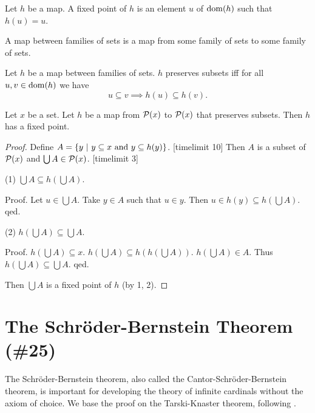 \documentclass{article}
\newcommand{\pow}{{\cal P}}
\begin{document}
 \begin{forthel}
    \begin{definition}
      Let $h$ be a map.
      A fixed point of $h$ is an element $u$ of $\operatorname{dom}(h)$ such that $h(u) = u$.
    \end{definition}

    \begin{definition}
      A map between families of sets is a map from some family of
sets to some
      family of sets.
    \end{definition}

    \begin{definition*}
Let $h$ be a map between families of sets.
      $h$ preserves subsets iff for all $u, v \in \operatorname{dom}(h)$
      we have \[ u \subseteq v \implies h(u) \subseteq h(v). \]
    \end{definition*}


    \begin{theorem*}\label{KT}
      Let $x$ be a set.
      Let $h$ be a map from $\pow(x)$ to $\pow(x)$ that preserves subsets.
      Then $h$ has a fixed point.
    \end{theorem*}
    \begin{proof}
      Define $A = \class{y | \text{$y \subseteq x$ and
      $y \subseteq h(y)$}}$.
[timelimit 10]
      Then $A$ is a subset of $\pow(x)$ and
      $\bigcup A \in \pow(x)$.
[timelimit 3]

(1) $\bigcup A \subseteq h(\bigcup A)$.

Proof.        Let $u \in \bigcup A$.
        Take $y \in A$ such that $u \in y$.
        Then $u \in h(y) \subseteq h(\bigcup A)$.
      qed.

(2) $h(\bigcup A) \subseteq \bigcup A$.

Proof.      $h(\bigcup A) \subseteq x$.
$h(\bigcup A) \subseteq h(h(\bigcup A))$.
$h(\bigcup A) \in A$.
Thus $h(\bigcup A) \subseteq \bigcup A$.
qed.

Then $\bigcup A$ is a fixed point of $h$ (by 1, 2).
    \end{proof}

\end{forthel}

\section{The Schröder-Bernstein Theorem (\#25)}

The Schröder-Bernstein theorem, also called the
Cantor-Schröder-Bernstein theorem, is important for developing
the theory of infinite cardinals without the axiom of choice.
We base the proof on the Tarski-Knaster theorem, following
 \cite{Schroeder2012}.
\end{document}
